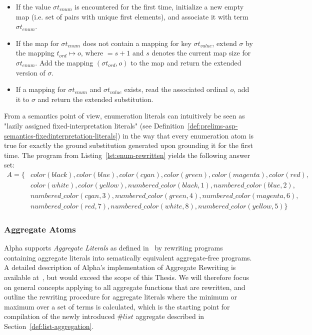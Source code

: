 \begin{itemize}
    \item If the value $\sigma t_{enum}$ is encountered for the first time, initialize a new empty map (i.e. set of pairs with unique first elements), and associate it with  term $\sigma t_{enum}$.
    \item If the map for $\sigma t_{enum}$ does not contain a mapping for key $\sigma t_{value}$, extend $\sigma$ by the mapping $t_{ord} \mapsto o$, where $ = s + 1$ and $s$ denotes the current map size for $\sigma t_{enum}$. Add the mapping $(\sigma t_{ord}, o)$ to the map and return the extended version of $\sigma$.
    \item If a mapping for $\sigma t_{enum}$ and $\sigma t_{value}$ exists, read the associated ordinal $o$, add it to $\sigma$ and return the extended substitution.
\end{itemize}    
From a semantics point of view, enumeration literals can intuitively be seen as "lazily assigned fixed-interpretation literals"  (see Definition~\ref{def:prelims-asp-semantics-fixedinterpretation-literals}) in the way that every enumeration atom is true for exactly the ground substitution generated upon grounding it for the first time. The program from Listing~\ref{lst:enum-rewritten} yields the following answer set:
\begin{align*}
    A = \{ &color(black), color(blue), color(cyan), color(green), color(magenta), color(red),\\
           &color(white), color(yellow), numbered\_color(black, 1), numbered\_color(blue, 2),\\
           &numbered\_color(cyan, 3), numbered\_color(green, 4), numbered\_color(magenta, 6),\\
           &numbered\_color(red, 7), numbered\_color(white, 8), numbered\_color(yellow, 5)\}
\end{align*}    

\subsubsection{Aggregate Atoms}
\label{subsubsec:alpha-arch-aggregate-rewriting}

Alpha supports \emph{Aggregate Literals} as defined in~\cite[p.~3]{asp-core2} by rewriting programs containing aggregate literals into sematically equivalent aggregate-free programs. A detailed description of Alpha's implementation of Aggregate Rewriting is available at~\cite{alpha-aggregate-support}, but would exceed the scope of this Thesis. We will therefore focus on general concepts applying to all aggregate functions that are rewritten, and outline the rewriting procedure for aggregate literals where the minimum or maximum over a set of terms is calculated, which is the starting point for compilation of the newly introduced $\#list$ aggregate described in Section~\ref{def:list-aggregation}.

